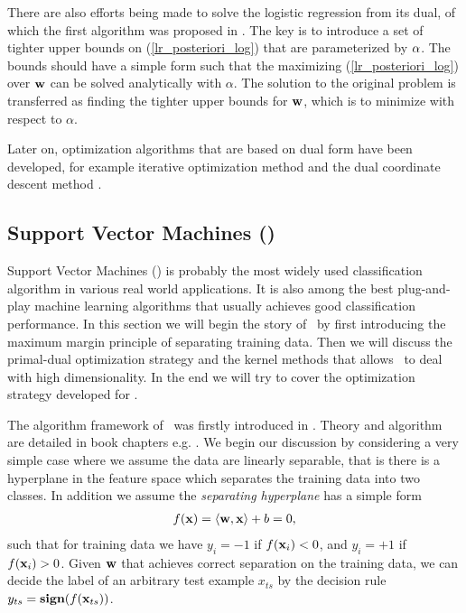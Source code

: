 {%
There are also efforts being made to solve the logistic regression from its dual, of which the first algorithm was proposed in \citep{Jaakkola99probabilistic}.
The key is to introduce a set of tighter upper bounds on (\ref{lr_posteriori_log}) that are parameterized by $\mathbf {\alpha}$.
The bounds should have a simple form such that the maximizing (\ref{lr_posteriori_log}) over $\mathbf {w}$ can be solved analytically with $\alpha$.
The solution to the original problem is transferred as finding the tighter upper bounds for  $\mathbf {w}$, which is to minimize with respect to $\alpha$.
\iffalse
The dual form is given by 
\begin{align*}
	\underset{\valpha}{\minimize} & \quad\frac{1}{2}\sum_{i=1}^{m}\sum_{j=1}^{m}\valpha_iy_ix_ix_jy_j\valpha_j + \sum_{i=1}^{m}\left[\valpha_i\log\alpha_i+(\sigma^2-\valpha_i)\log(\sigma^2-\valpha_i)\right] \\
	\st &\quad 0\le\alpha\le\sigma^2, \, \forall i=\{1,\cdots,m\}.
\end{align*}
\fi
Later on, optimization algorithms that are based on dual form have been developed, for example iterative optimization method \citep{Keerthi05a} and the dual coordinate descent method \citep{Yu11dual}.



%
\subsection{Support Vector Machines (\svm)}\label{sc_svm}
\label{sc_svm}

Support Vector Machines (\svm) is probably the most widely used classification algorithm in various real world applications.
It is also among the best plug-and-play machine learning algorithms that usually achieves good classification performance.
In this section we will begin the story of \svm\ by first introducing the maximum margin principle of separating training data.
Then we will discuss the primal-dual optimization strategy and the kernel methods that allows \svm\ to deal with high dimensionality.
In the end we will try to cover the optimization strategy developed for \svm.

The algorithm framework of \svm\ was firstly introduced in \citep{Boser92,Cortes95support}.
Theory and algorithm are detailed in book chapters e.g. \citep{Scholkopf02learning,taylor04,Bishop07}.
We begin our discussion by considering a very simple case where we assume the data are linearly separable, that is there is a hyperplane in the feature space which separates the training data into two classes.
In addition we assume the \textit{separating hyperplane} has a simple form
\begin{align*}
	f(\mathbf {x})=\langle \mathbf {w}, \mathbf {x} \rangle + b = 0,
\end{align*}
such that for training data we have $y_i=-1$ if $f(\mathbf {x}_i)<0$, and $y_i=+1$ if $f(\mathbf {x}_i)>0$.
Given $\mathbf {w}$ that achieves correct separation on the training data, we can decide the label of an arbitrary test example $x_{ts}$ by the decision rule $y_{ts}=\textbf{sign}(f(\mathbf {x}_{ts}))$.

}
